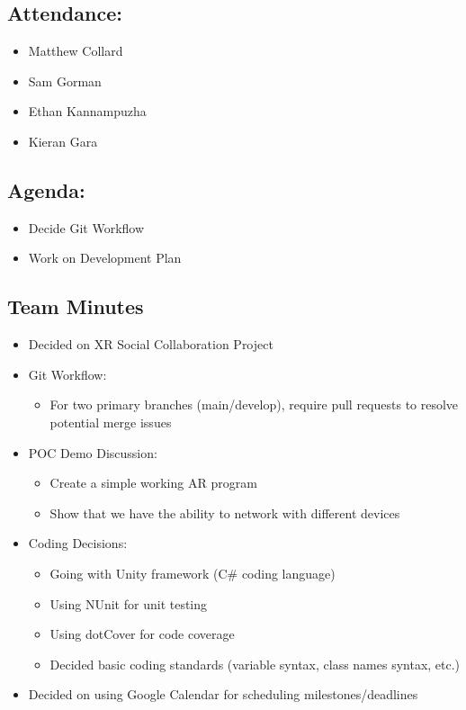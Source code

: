 \documentclass{article}
\begin{document}
\subsection*{Attendance:}
\begin{itemize}
    \item Matthew Collard
    \item Sam Gorman
    \item Ethan Kannampuzha
    \item Kieran Gara
\end{itemize}

\subsection*{Agenda:}
\begin{itemize}
    \item Decide Git Workflow
    \item Work on Development Plan
\end{itemize}

\subsection*{Team Minutes}

\begin{itemize}
    \item Decided on XR Social Collaboration Project
    \item Git Workflow:
    \begin{itemize}
        \item For two primary branches (main/develop), require pull requests to resolve potential merge issues
    \end{itemize}

    \item POC Demo Discussion:
    \begin{itemize}
        \item Create a simple working AR program
        \item Show that we have the ability to network with different devices
    \end{itemize}

    \item Coding Decisions:
    \begin{itemize}
        \item Going with Unity framework (C# coding language)
        \item Using NUnit for unit testing
        \item Using dotCover for code coverage
        \item Decided basic coding standards (variable syntax, class names syntax, etc.)
    \end{itemize}
    \item Decided on using Google Calendar for scheduling milestones/deadlines
\end{itemize}
\end{document}
